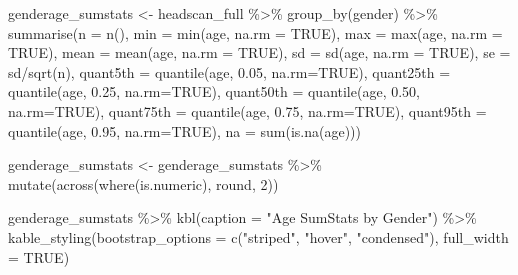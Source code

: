\documentclass[
]{article}
\newenvironment{Shaded}{\begin{snugshade}}{\end{snugshade}}
\newcommand{\AttributeTok}[1]{\textcolor[rgb]{0.77,0.63,0.00}{#1}}
\newcommand{\ConstantTok}[1]{\textcolor[rgb]{0.00,0.00,0.00}{#1}}
\newcommand{\DecValTok}[1]{\textcolor[rgb]{0.00,0.00,0.81}{#1}}
\newcommand{\FloatTok}[1]{\textcolor[rgb]{0.00,0.00,0.81}{#1}}
\newcommand{\FunctionTok}[1]{\textcolor[rgb]{0.00,0.00,0.00}{#1}}
\newcommand{\NormalTok}[1]{#1}
\newcommand{\OtherTok}[1]{\textcolor[rgb]{0.56,0.35,0.01}{#1}}
\newcommand{\SpecialCharTok}[1]{\textcolor[rgb]{0.00,0.00,0.00}{#1}}
\newcommand{\StringTok}[1]{\textcolor[rgb]{0.31,0.60,0.02}{#1}}
\begin{document}
\begin{Shaded}
\begin{Highlighting}[]
\NormalTok{genderage\_sumstats }\OtherTok{\textless{}{-}}\NormalTok{ headscan\_full }\SpecialCharTok{\%\textgreater{}\%} 
  \FunctionTok{group\_by}\NormalTok{(gender) }\SpecialCharTok{\%\textgreater{}\%} 
  \FunctionTok{summarise}\NormalTok{(}\AttributeTok{n =} \FunctionTok{n}\NormalTok{(),}
            \AttributeTok{min =} \FunctionTok{min}\NormalTok{(age, }\AttributeTok{na.rm =} \ConstantTok{TRUE}\NormalTok{),}
            \AttributeTok{max =} \FunctionTok{max}\NormalTok{(age, }\AttributeTok{na.rm =} \ConstantTok{TRUE}\NormalTok{),}
            \AttributeTok{mean =} \FunctionTok{mean}\NormalTok{(age, }\AttributeTok{na.rm =} \ConstantTok{TRUE}\NormalTok{),}
            \AttributeTok{sd =} \FunctionTok{sd}\NormalTok{(age, }\AttributeTok{na.rm =} \ConstantTok{TRUE}\NormalTok{),}
            \AttributeTok{se =}\NormalTok{ sd}\SpecialCharTok{/}\FunctionTok{sqrt}\NormalTok{(n),}
            \AttributeTok{quant5th =} \FunctionTok{quantile}\NormalTok{(age, }\FloatTok{0.05}\NormalTok{, }\AttributeTok{na.rm=}\ConstantTok{TRUE}\NormalTok{),}
            \AttributeTok{quant25th =} \FunctionTok{quantile}\NormalTok{(age, }\FloatTok{0.25}\NormalTok{, }\AttributeTok{na.rm=}\ConstantTok{TRUE}\NormalTok{),}
            \AttributeTok{quant50th =} \FunctionTok{quantile}\NormalTok{(age, }\FloatTok{0.50}\NormalTok{, }\AttributeTok{na.rm=}\ConstantTok{TRUE}\NormalTok{),}
            \AttributeTok{quant75th =} \FunctionTok{quantile}\NormalTok{(age, }\FloatTok{0.75}\NormalTok{, }\AttributeTok{na.rm=}\ConstantTok{TRUE}\NormalTok{),}
            \AttributeTok{quant95th =} \FunctionTok{quantile}\NormalTok{(age, }\FloatTok{0.95}\NormalTok{, }\AttributeTok{na.rm=}\ConstantTok{TRUE}\NormalTok{),}
            \AttributeTok{na =} \FunctionTok{sum}\NormalTok{(}\FunctionTok{is.na}\NormalTok{(age)))}

\NormalTok{genderage\_sumstats }\OtherTok{\textless{}{-}}\NormalTok{ genderage\_sumstats }\SpecialCharTok{\%\textgreater{}\%} 
  \FunctionTok{mutate}\NormalTok{(}\FunctionTok{across}\NormalTok{(}\FunctionTok{where}\NormalTok{(is.numeric), round, }\DecValTok{2}\NormalTok{))}
            
\NormalTok{genderage\_sumstats }\SpecialCharTok{\%\textgreater{}\%} 
  \FunctionTok{kbl}\NormalTok{(}\AttributeTok{caption =} \StringTok{"Age SumStats by Gender"}\NormalTok{) }\SpecialCharTok{\%\textgreater{}\%} 
  \FunctionTok{kable\_styling}\NormalTok{(}\AttributeTok{bootstrap\_options =} \FunctionTok{c}\NormalTok{(}\StringTok{"striped"}\NormalTok{, }\StringTok{"hover"}\NormalTok{, }\StringTok{"condensed"}\NormalTok{), }\AttributeTok{full\_width =} \ConstantTok{TRUE}\NormalTok{)}
\end{Highlighting}
\end{Shaded}
\end{document}
